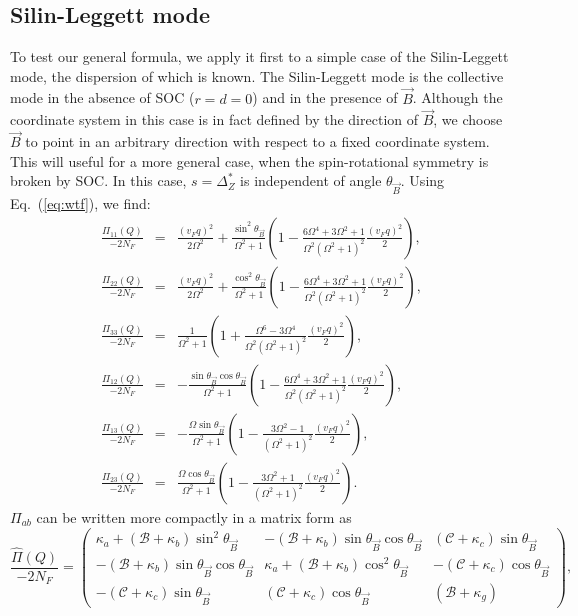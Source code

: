 \documentclass[prb,aps,twocolumn]{revtex4}
\newcommand{\beq}{\begin{equation}}
\newcommand{\eeq}{\end{equation}}
\newcommand{\bea}{\begin{eqnarray}}
\newcommand{\eea}{\end{eqnarray}}
\newcommand{\bB}{{\vec B}}
\newcommand{\nn}{\nonumber}
\begin{document}
\begin{widetext}
\subsection{Silin-Leggett mode}
\label{app:SL} To test our general formula, we apply it first to a
simple case of the Silin-Leggett mode, the dispersion of which is
known. \cite{mineev} The Silin-Leggett mode is the collective mode
in the absence of SOC ($r=d=0$) and in the presence of $\vec B$.
Although the coordinate system in this case is in fact defined by
the direction of $\vec B$, we choose $\bB$ to point in an
arbitrary direction with respect to a fixed coordinate system.
This will useful for a more general case, when the spin-rotational
symmetry is broken by SOC. In this case, $s=\Delta^*_Z$ is
independent of angle $\theta_{\bB}$. Using Eq.~(\ref{eq:wtf}), we
find:
\bea
\frac{\Pi_{11}(Q)}{-2N_F}&=&\frac{(v_Fq)^2}{2\Omega^2}+\frac{\sin^2\theta_\bB}{\Omega^2+1}
\left(1-\frac{6\Omega^4+3\Omega^2+1}{\Omega^2(\Omega^2+1)^2}\frac{(v_Fq)^2}{2}\right),\label{eq:alpi}\nn\\
\frac{\Pi_{22}(Q)}{-2N_F}&=&\frac{(v_Fq)^2}{2\Omega^2}+\frac{\cos^2\theta_\bB}{\Omega^2+1}
\left(1-\frac{6\Omega^4+3\Omega^2+1}{\Omega^2(\Omega^2+1)^2}\frac{(v_Fq)^2}{2}\right),\nn\\
\frac{\Pi_{33}(Q)}{-2N_F}&=&\frac{1}{\Omega^2+1}
\left(1+\frac{\Omega^6-3\Omega^4}{\Omega^2(\Omega^2+1)^2}\frac{(v_Fq)^2}{2}\right),\nn\\
\frac{\Pi_{12}(Q)}{-2N_F}&=&-\frac{\sin\theta_\bB\cos\theta_\bB}{\Omega^2+1}
\left(1-\frac{6\Omega^4+3\Omega^2+1}{\Omega^2(\Omega^2+1)^2}\frac{(v_Fq)^2}{2}\right),\nn\\
\frac{\Pi_{13}(Q)}{-2N_F}&=&-\frac{\Omega\sin\theta_\bB}{\Omega^2+1}\left(1-\frac{3\Omega^2-1}{(\Omega^2+1)^2}\frac{(v_Fq)^2}{2}\right),\nn\\
\frac{\Pi_{23}(Q)}{-2N_F}&=&\frac{\Omega\cos\theta_\bB}{\Omega^2+1}\left(1-\frac{3\Omega^2+1}{(\Omega^2+1)^2}\frac{(v_Fq)^2}{2}\right).\label{eq:alpi2}
\eea $\Pi_{ab}$ can be written more compactly in a matrix form as
\beq\label{eq:mat2t} \frac{\hat\Pi(Q)}{-2N_F}=
\left(\begin{array}{ccc}
\kappa_a+(\mathcal{B}+\kappa_b)\sin^2\theta_\bB&-(\mathcal{B}+\kappa_b)\sin\theta_\bB\cos\theta_\bB&(\mathcal{C}+\kappa_c)\sin\theta_\bB\\
-(\mathcal{B}+\kappa_b)\sin\theta_\bB\cos\theta_\bB&\kappa_a+(\mathcal{B}+\kappa_b)\cos^2\theta_\bB&-(\mathcal{C}+\kappa_c)\cos\theta_\bB\\
-(\mathcal{C}+\kappa_c)\sin\theta_\bB
&(\mathcal{C}+\kappa_c)\cos\theta_\bB&(\mathcal{B}+\kappa_g)
\end{array}
\right), \eeq \end{widetext}
\end{document}
